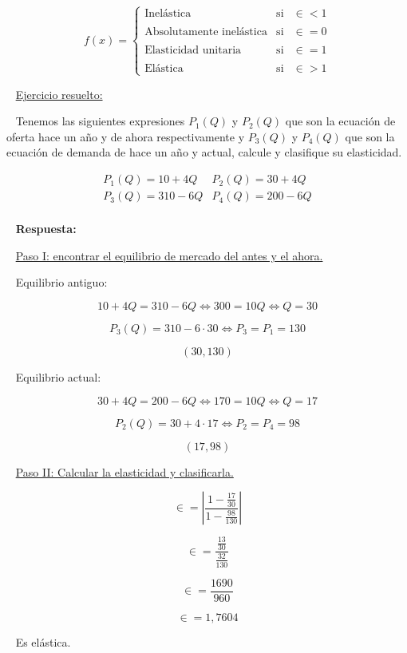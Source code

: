\documentclass[
  letterpaper,
  DIV=11,
  numbers=noendperiod]{scrreport}
\begin{document}
\[
f(x)= \left\{ \begin{array}{lcc}
     \text{Inelástica} &   \text{si}  & \in < 1 \\
     \\ \text{Absolutamente inelástica} &  \text{si} & \in = 0 \\
     \\ \text{Elasticidad unitaria} &  \text{si}  & \in = 1 \\
     \\ \text{Elástica} &  \text{si}  & \in > 1
     \end{array}
\right.
\]

~ \ul{Ejercicio resuelto:}

~ Tenemos las siguientes expresiones \(P_1(Q)\) y \(P_2(Q)\) que son la
ecuación de oferta hace un año y de ahora respectivamente y \(P_3(Q)\) y
\(P_4(Q)\) que son la ecuación de demanda de hace un año y actual,
calcule y clasifique su elasticidad.

\[
\begin{matrix}
    P_1(Q)=10+4Q &  P_2(Q)=30+4Q \\
    P_3(Q)=310-6Q & P_4(Q)=200-6Q \\
\end{matrix}
\]

~ \textbf{Respuesta:}

~ \ul{Paso I: encontrar el equilibrio de mercado del antes y el ahora.}

~ Equilibrio antiguo:

\[
10+4Q=310-6Q \Leftrightarrow 300=10Q \Leftrightarrow Q=30
\]

\[
P_3(Q)=310-6 \cdot 30 \Leftrightarrow P_3 = P_1 = 130
\]

\[
(30,130)
\]

~ Equilibrio actual:

\[
30+4Q=200-6Q \Leftrightarrow 170=10Q \Leftrightarrow Q=17
\]

\[
P_2(Q)=30+4 \cdot 17 \Leftrightarrow P_2 = P_4 = 98
\]

\[
(17,98)
\]

~ \ul{Paso II: Calcular la elasticidad y clasificarla.}

\[
\in =\left|\dfrac{1-\frac{17}{30}}{1-\frac{98}{130}} \right|
\]

\[
\in =\dfrac{\frac{13}{30}}{\frac{32}{130}}
\]

\[
\in =\dfrac{1690}{960}
\]

\[
\in =1,7604
\]

~ Es elástica.
\end{document}
